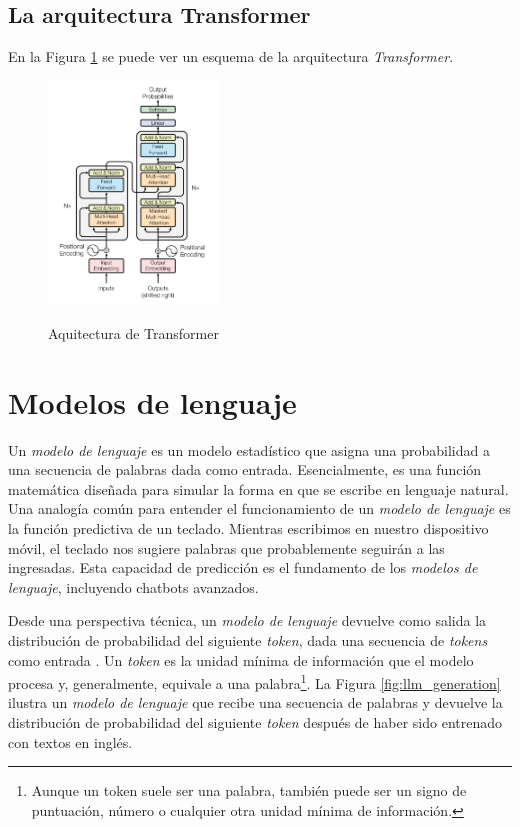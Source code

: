 \subsection{La arquitectura Transformer}

En la Figura \ref{fig:transformer_architecture} se puede ver un esquema de la arquitectura \textit{Transformer}.

\begin{figure}[h]
    \caption[Aquitectura de Transformer]{Aquitectura de Transformer}
    \centering
    \includegraphics[width=0.4\textwidth]{./figuras/Transformer_architecture.png}
    \label{fig:transformer_architecture}
\end{figure}

\section{Modelos de lenguaje}

Un \textit{modelo de lenguaje} es un modelo estadístico que asigna una probabilidad a una secuencia de palabras dada como entrada. Esencialmente, es una función matemática diseñada para simular la forma en que se escribe en lenguaje natural. Una analogía común para entender el funcionamiento de un \textit{modelo de lenguaje} es la función predictiva de un teclado. Mientras escribimos en nuestro dispositivo móvil, el teclado nos sugiere palabras que probablemente seguirán a las ingresadas. Esta capacidad de predicción es el fundamento de los \textit{modelos de lenguaje}, incluyendo chatbots avanzados.

Desde una perspectiva técnica, un \textit{modelo de lenguaje} devuelve como salida la distribución de probabilidad del siguiente \textit{token}, dada una secuencia de \textit{tokens} como entrada \citep{GenerationLLMs}. Un \textit{token} es la unidad mínima de información que el modelo procesa y, generalmente, equivale a una palabra\footnote{Aunque un token suele ser una palabra, también puede ser un signo de puntuación, número o cualquier otra unidad mínima de información.}. La Figura \ref{fig:llm_generation} ilustra un \textit{modelo de lenguaje} que recibe una secuencia de palabras y devuelve la distribución de probabilidad del siguiente \textit{token} después de haber sido entrenado con textos en inglés.

